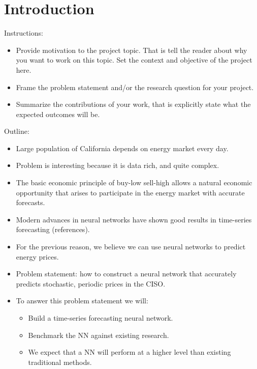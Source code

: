 \documentclass[sigconf]{acmart}
\begin{document}
\section{Introduction}

Instructions:
\begin{itemize}
    \item Provide motivation to the project topic. That is tell the reader about why you want to work on this topic. Set the context and objective of the project here. 
    \item Frame the problem statement and/or the research question for your project.
    \item Summarize the contributions of your work, that is explicitly state what the expected outcomes will be. 
\end{itemize}

Outline:
\begin{itemize}
	\item Large population of California depends on energy market every day.
	\item Problem is interesting because it is data rich, and quite complex.
	\item The basic economic principle of buy-low sell-high allows a natural economic opportunity that arises to participate in the energy market with accurate forecasts.
	\item Modern advances in neural networks have shown good results in time-series forecasting (references).
	\item For the previous reason, we believe we can use neural networks to predict energy prices.
	\item Problem statement: how to construct a neural network that accurately predicts stochastic, periodic prices in the CISO.
	\item To answer this problem statement we will:
	\begin{itemize}
		\item Build a time-series forecasting neural network.
		\item Benchmark the NN against existing research.
		\item We expect that a NN will perform at a higher level than existing traditional methods. 
	\end {itemize}
\end{itemize}
	
\end{document}
